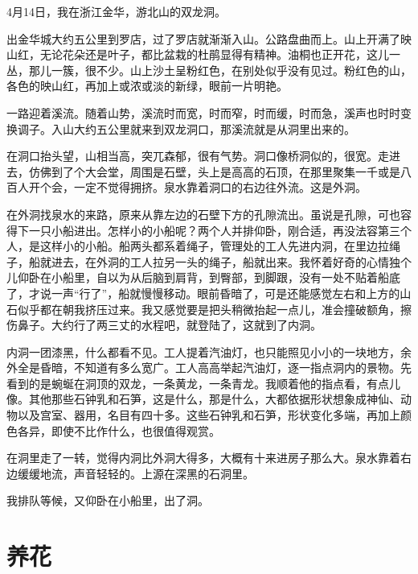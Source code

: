 \documentclass[12pt,UTF-8,openany]{ctexbook}
\begin{document}
\begin{large}
    
    4月14日，我在浙江金华，游北山的双龙洞。
    
    出金华城大约五公里到罗店，过了罗店就渐渐入山。公路盘曲而上。山上开满了映山红，无论花朵还是叶子，都比盆栽的杜鹃显得有精神。油桐也正开花，这儿一丛，那儿一簇，很不少。山上沙土呈粉红色，在别处似乎没有见过。粉红色的山，各色的映山红，再加上或浓或淡的新绿，眼前一片明艳。
    
    一路迎着溪流。随着山势，溪流时而宽，时而窄，时而缓，时而急，溪声也时时变换调子。入山大约五公里就来到双龙洞口，那溪流就是从洞里出来的。
    
    在洞口抬头望，山相当高，突兀森郁，很有气势。洞口像桥洞似的，很宽。走进去，仿佛到了个大会堂，周围是石壁，头上是高高的石顶，在那里聚集一千或是八百人开个会，一定不觉得拥挤。泉水靠着洞口的右边往外流。这是外洞。
    
    在外洞找泉水的来路，原来从靠左边的石壁下方的孔隙流出。虽说是孔隙，可也容得下一只小船进出。怎样小的小船呢？两个人并排仰卧，刚合适，再没法容第三个人，是这样小的小船。船两头都系着绳子，管理处的工人先进内洞，在里边拉绳子，船就进去，在外洞的工人拉另一头的绳子，船就出来。我怀着好奇的心情独个儿仰卧在小船里，自以为从后脑到肩背，到臀部，到脚跟，没有一处不贴着船底了，才说一声“行了”，船就慢慢移动。眼前昏暗了，可是还能感觉左右和上方的山石似乎都在朝我挤压过来。我又感觉要是把头稍微抬起一点儿，准会撞破额角，擦伤鼻子。大约行了两三丈的水程吧，就登陆了，这就到了内洞。
    
    内洞一团漆黑，什么都看不见。工人提着汽油灯，也只能照见小小的一块地方，余外全是昏暗，不知道有多么宽广。工人高高举起汽油灯，逐一指点洞内的景物。先看到的是蜿蜒在洞顶的双龙，一条黄龙，一条青龙。我顺着他的指点看，有点儿像。其他那些石钟乳和石笋，这是什么，那是什么，大都依据形状想象成神仙、动物以及宫室、器用，名目有四十多。这些石钟乳和石笋，形状变化多端，再加上颜色各异，即使不比作什么，也很值得观赏。
    
    在洞里走了一转，觉得内洞比外洞大得多，大概有十来进房子那么大。泉水靠着右边缓缓地流，声音轻轻的。上源在深黑的石洞里。
    
    我排队等候，又仰卧在小船里，出了洞。
    
\end{large}



\chapter{养花}
\end{document}
